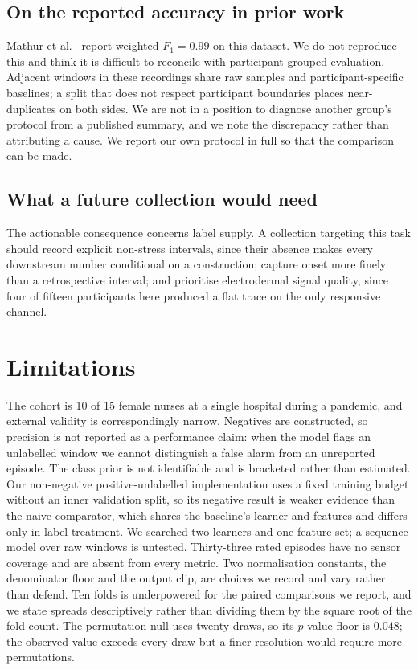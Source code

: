 \documentclass{article}
\begin{document}
\subsection{On the reported accuracy in prior work}

Mathur et al.\ \cite{mathur2024} report weighted $F_1 = 0.99$ on this dataset.
We do not reproduce this and think it is difficult to reconcile with
participant-grouped evaluation. Adjacent windows in these recordings share raw
samples and participant-specific baselines; a split that does not respect
participant boundaries places near-duplicates on both sides. We are not in a
position to diagnose another group's protocol from a published summary, and we
note the discrepancy rather than attributing a cause. We report our own
protocol in full so that the comparison can be made.

\subsection{What a future collection would need}

The actionable consequence concerns label supply. A collection targeting this
task should record explicit non-stress intervals, since their absence makes
every downstream number conditional on a construction; capture onset more
finely than a retrospective interval; and prioritise electrodermal signal
quality, since four of fifteen participants here produced a flat trace on the
only responsive channel.

\section{Limitations}

The cohort is 10 of 15 female nurses at a single hospital during a pandemic,
and external validity is correspondingly narrow. Negatives are constructed, so
precision is not reported as a performance claim: when the model flags an
unlabelled window we cannot distinguish a false alarm from an unreported
episode. The class prior is not identifiable and is bracketed rather than
estimated. Our non-negative positive-unlabelled implementation uses a fixed
training budget without an inner validation split, so its negative result is
weaker evidence than the naive comparator, which shares the baseline's learner
and features and differs only in label treatment. We searched two learners and
one feature set; a sequence model over raw windows is untested. Thirty-three
rated episodes have no sensor coverage and are absent from every metric. Two
normalisation constants, the denominator floor and the output clip, are choices
we record and vary rather than defend. Ten folds is underpowered for the paired
comparisons we report, and we state spreads descriptively rather than dividing
them by the square root of the fold count. The permutation null uses twenty
draws, so its $p$-value floor is $0.048$; the observed value exceeds every draw
but a finer resolution would require more permutations.
\end{document}
